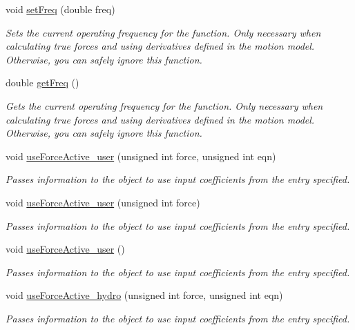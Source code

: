 \begin{DoxyCompactItemize}
void \hyperlink{classosea_1_1ofreq_1_1_motion_model_a18e880b4a0b1a1d1c385bc3be3524440}{set\-Freq} (double freq)
\begin{DoxyCompactList}\small\item\em Sets the current operating frequency for the function. Only necessary when calculating true forces and using derivatives defined in the motion model. Otherwise, you can safely ignore this function. \end{DoxyCompactList}\item 
double \hyperlink{classosea_1_1ofreq_1_1_motion_model_a3461ede3739b468b6bab3a05f94093cc}{get\-Freq} ()
\begin{DoxyCompactList}\small\item\em Gets the current operating frequency for the function. Only necessary when calculating true forces and using derivatives defined in the motion model. Otherwise, you can safely ignore this function. \end{DoxyCompactList}\item 
void \hyperlink{classosea_1_1ofreq_1_1_motion_model_aaf761fac4693612a10771e38993431a0}{use\-Force\-Active\-\_\-user} (unsigned int force, unsigned int eqn)
\begin{DoxyCompactList}\small\item\em Passes information to the object to use input coefficients from the entry specified. \end{DoxyCompactList}\item 
void \hyperlink{classosea_1_1ofreq_1_1_motion_model_a6b402b9e9cfab05159732f38035434b5}{use\-Force\-Active\-\_\-user} (unsigned int force)
\begin{DoxyCompactList}\small\item\em Passes information to the object to use input coefficients from the entry specified. \end{DoxyCompactList}\item 
void \hyperlink{classosea_1_1ofreq_1_1_motion_model_a78243e9d9fd197b4675aad8b728de55e}{use\-Force\-Active\-\_\-user} ()
\begin{DoxyCompactList}\small\item\em Passes information to the object to use input coefficients from the entry specified. \end{DoxyCompactList}\item 
void \hyperlink{classosea_1_1ofreq_1_1_motion_model_a4d3e0590135e1a9f7ce954406f99ff44}{use\-Force\-Active\-\_\-hydro} (unsigned int force, unsigned int eqn)
\begin{DoxyCompactList}\small\item\em Passes information to the object to use input coefficients from the entry specified. \end{DoxyCompactList}\item 

\end{DoxyCompactItemize}
